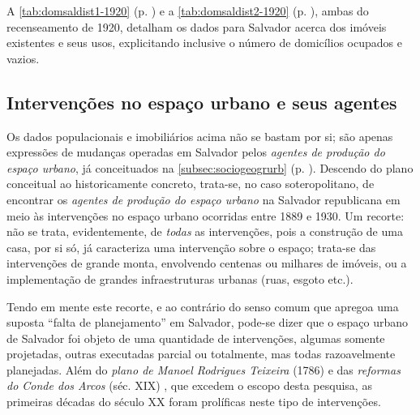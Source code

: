 

A \autoref{tab:domsaldist1-1920} (p. \pageref{tab:domsaldist1-1920}) e a \autoref{tab:domsaldist2-1920} (p. \pageref{tab:domsaldist2-1920}), ambas do recenseamento de 1920, detalham os dados para Salvador acerca dos imóveis existentes e seus usos, explicitando inclusive o número de domicílios ocupados e vazios.




\subsection{Intervenções no espaço urbano e seus agentes}\label{subsec:1.4.3}

Os dados populacionais e imobiliários acima não se bastam por si; são apenas expressões de mudanças operadas em Salvador pelos \textit{agentes de produção do espaço urbano}, já conceituados na \autoref{subsec:sociogeogrurb} (p. \pageref{subsec:sociogeogrurb}). Descendo do plano conceitual ao historicamente concreto, trata-se, no caso soteropolitano, de encontrar os \textit{agentes de produção do espaço urbano} na Salvador republicana em meio às intervenções no espaço urbano ocorridas entre 1889 e 1930. Um recorte: não se trata, evidentemente, de \textit{todas} as intervenções, pois a construção de uma casa, por si só, já caracteriza uma intervenção sobre o espaço; trata-se das intervenções de grande monta, envolvendo centenas ou milhares de imóveis, ou a implementação de grandes infraestruturas urbanas (ruas, esgoto etc.).

Tendo em mente este recorte, e ao contrário do senso comum que apregoa uma suposta ``falta de planejamento'' em Salvador, pode-se dizer que o espaço urbano de Salvador foi objeto de uma quantidade de intervenções, algumas somente projetadas, outras executadas parcial ou totalmente, mas todas razoavelmente planejadas. Além do \textit{plano de Manoel Rodrigues Teixeira} (1786) \cite[p.~318]{ruy_politica_1949} e das \textit{reformas do Conde dos Arcos} (séc. XIX) \cite{sampaio_formas_1999,VASCONCELOS2002}, que excedem o escopo desta pesquisa, as primeiras décadas do século XX foram prolíficas neste tipo de intervenções.

